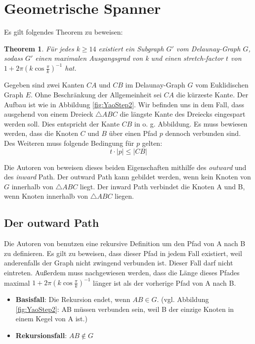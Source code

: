 \documentclass[a4paper,twoside]{IEEEtran}
\newtheorem{boundedSpannerTheorem}{Theorem}[section]
\begin{document}
\section{Geometrische Spanner}

Es gilt folgendes Theorem zu beweisen:

\begin{boundedSpannerTheorem}
Für jedes $k \geq 14 $ existiert ein Subgraph $G' $ vom Delaunay-Graph $G $, sodass $G' $ einen maximalen Ausgangsgrad von k und einen stretch-factor $t $ von $1+2\pi(k \cos{\frac{\pi}{k}})^{-1} $ hat.
\end{boundedSpannerTheorem}
Gegeben sind zwei Kanten $CA $ und $CB $ im Delaunay-Graph $G $ vom Euklidischen Graph $E $.
Ohne Beschränkung der Allgemeinheit sei $CA $ die kürzeste Kante.
Der Aufbau ist wie in Abbildung \ref{fig:YaoStep2}.
Wir befinden uns in dem Fall, dass ausgehend von einem Dreieck $\triangle{ABC} $ die längste Kante des Dreiecks eingespart werden soll.
Dies entspricht der Kante $CB $ in o. g. Abbildung.
Es muss bewiesen werden, dass die Knoten $C $ und $B $ über einen Pfad $p $ dennoch verbunden sind.
Des Weiteren muss folgende Bedingung für $p $ gelten:
\begin{equation*}
 t \cdot |p| \leq	|CB| 
\end{equation*}



Die Autoren von \cite{kanj} beweisen dieses beiden Eigenschaften mithilfe des \emph{outward} und des \emph{inward} Path. %
Der outward Path kann gebildet werden, wenn kein Knoten von $G $ innerhalb von $\triangle {ABC} $ liegt.
Der inward Path verbindet die Knoten A und B, wenn Knoten innerhalb von $\triangle {ABC} $ liegen.

\subsection{Der outward Path}
Die Autoren von \cite{kanj} benutzen eine rekursive Definition um den Pfad von A nach B zu definieren.
Es gilt zu beweisen, dass dieser Pfad in jedem Fall existiert, weil anderenfalls der Graph nicht zwingend verbunden ist.
Dieser Fall darf nicht eintreten.
Außerdem muss nachgewiesen werden, dass die Länge dieses Pfades maximal
$1+2\pi(k \cos{\frac{\pi}{k}})^{-1} $ länger ist als der vorherige Pfad von A nach B.


\begin{itemize}
\item \textbf{Basisfall}: Die Rekursion endet, wenn $AB \in G $. (vgl. Abbildung \ref{fig:YaoStep2}: AB müssen verbunden sein, weil B der einzige Knoten in einem Kegel von A ist.)
\item \textbf{Rekursionsfall}: $AB \notin G $
\end{itemize}
\end{document}
